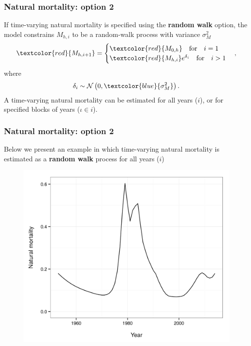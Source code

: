\documentclass{beamer}
\begin{document}

\begin{frame}
\frametitle{Natural mortality: option 2}
If time-varying natural mortality is specified using the {\bf random walk}
option, the model constrains $M_{h,i}$ to be a random-walk process with variance
$\sigma^2_M$
\begin{equation*}
  \textcolor{red}{M_{h,i+1}} = 
  \begin{cases}
    \textcolor{red}{M_{0,h}} \quad \text{for} \quad i=1\\
    \textcolor{red}{M_{h,i}} e^{\delta_i} \quad \text{for} \quad i>1
  \end{cases},
\end{equation*}
where
\begin{equation*}
  \delta_i \sim \mathcal{N} \left( 0, \textcolor{blue}{\sigma^2_M} \right).
\end{equation*}
A time-varying natural mortality can be estimated for all years ($i$), or for
specified blocks of years ($\iota \in i$).
\end{frame}


\begin{frame}
\frametitle{Natural mortality: option 2}
Below we present an example in which time-varying natural mortality is estimated
as a {\bf random walk} process for all years ($i$)
\begin{figure}[!htbp]
  \centering
  \includegraphics[width=0.65\linewidth]{figure/M_t_walk.png}
\end{figure}
\end{frame}

\end{document}
